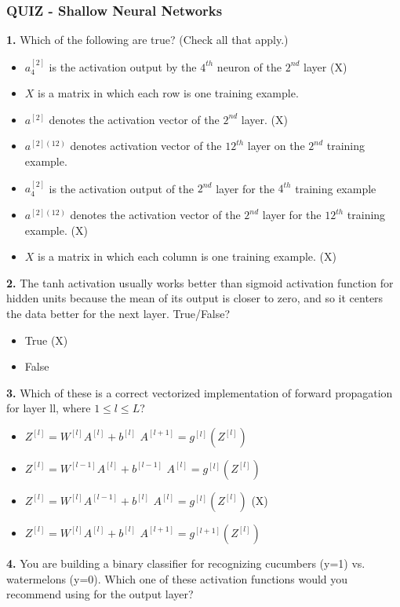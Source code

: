 \subsubsection*{QUIZ - Shallow Neural Networks}
\textbf{1.} Which of the following are true? (Check all that apply.)
\begin{itemize}
    \item $a^{[2]}_4$ is the activation output by the $4^{th}$ neuron of the $2^{nd}$ layer (X)
    \item $X$ is a matrix in which each row is one training example.
    \item $a^{[2]}$ denotes the activation vector of the $2^{nd}$ layer. (X)
    \item $a^{[2](12)}$ denotes activation vector of the $12^{th}$ layer on the $2^{nd}$ training example.
    \item $a^{[2]}_4$ is the activation output of the $2^{nd}$ layer for the $4^{th}$ training example
    \item $a^{[2](12)}$ denotes the activation vector of the $2^{nd}$ layer for the $12^{th}$ training example. (X)
    \item $X$ is a matrix in which each column is one training example. (X)
\end{itemize}
\textbf{2.} The tanh activation usually works better than sigmoid activation function for hidden units because the mean of its output is closer to zero, and so it centers the data better for the next layer. True/False?
\begin{itemize}
    \item True (X)
    \item False
\end{itemize}
\textbf{3.} Which of these is a correct vectorized implementation of forward propagation for layer ll, where $1 \leq l \leq L$?
\begin{itemize}
    \item $Z^{[l]} = W^{[l]} A^{[l]}+ b^{[l]}$ $A^{[l+1]} = g^{[l]}(Z^{[l]})$
    \item $Z^{[l]} = W^{[l-1]} A^{[l]}+ b^{[l-1]}$ $A^{[l]} = g^{[l]}(Z^{[l]})$
    \item $Z^{[l]} = W^{[l]} A^{[l-1]}+ b^{[l]}$ $A^{[l]} = g^{[l]}(Z^{[l]})$ (X)
    \item $Z^{[l]} = W^{[l]} A^{[l]}+ b^{[l]}$ $A^{[l+1]} = g^{[l+1]}(Z^{[l]})$
\end{itemize}
\textbf{4.} You are building a binary classifier for recognizing cucumbers (y=1) vs. watermelons (y=0). Which one of these activation functions would you recommend using for the output layer?
